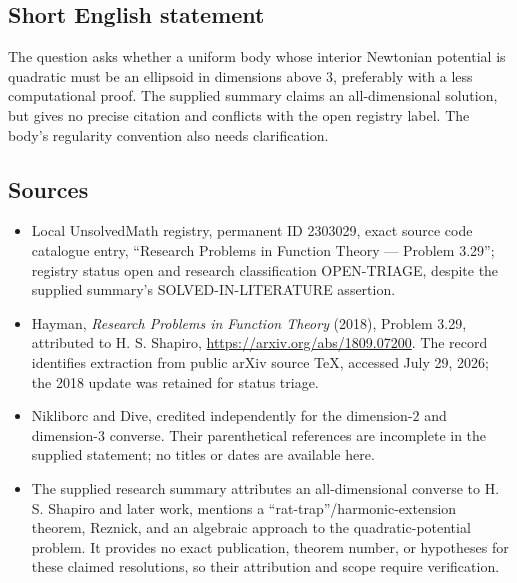 \documentclass[11pt]{article}
\begin{document}
\subsection{Short English statement}
The question asks whether a uniform body whose interior Newtonian potential is quadratic must be an ellipsoid in dimensions above $3$, preferably with a less computational proof. The supplied summary claims an all-dimensional solution, but gives no precise citation and conflicts with the open registry label. The body's regularity convention also needs clarification.
\subsection{Sources}
\begin{itemize}
\item Local UnsolvedMath registry, permanent ID 2303029, exact source code catalogue entry, ``Research Problems in Function Theory --- Problem 3.29''; registry status open and research classification OPEN-TRIAGE, despite the supplied summary's SOLVED-IN-LITERATURE assertion.
\item Hayman, \emph{Research Problems in Function Theory} (2018), Problem 3.29, attributed to H. S. Shapiro, \url{https://arxiv.org/abs/1809.07200}. The record identifies extraction from public arXiv source TeX, accessed July 29, 2026; the 2018 update was retained for status triage.
\item Nikliborc and Dive, credited independently for the dimension-$2$ and dimension-$3$ converse. Their parenthetical references are incomplete in the supplied statement; no titles or dates are available here.
\item The supplied research summary attributes an all-dimensional converse to H. S. Shapiro and later work, mentions a ``rat-trap''/harmonic-extension theorem, Reznick, and an algebraic approach to the quadratic-potential problem. It provides no exact publication, theorem number, or hypotheses for these claimed resolutions, so their attribution and scope require verification.
\end{itemize}
\end{document}
